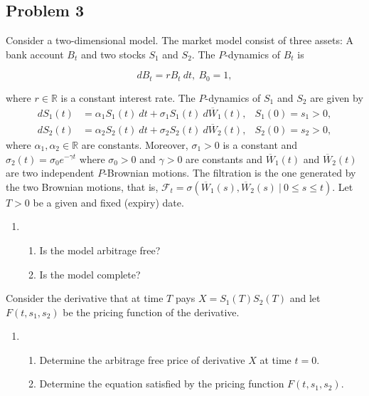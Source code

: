\documentclass[a4paper,12pt,openany]{book}
\providecommand{\tightlist}{%
 \setlength{\itemsep}{0pt}\setlength{\parskip}{0pt}}
\begin{document}
\noindent\makebox[\linewidth]{\rule{\textwidth}{0.4pt}}

\hypertarget{problem-3}{%
\subsection{Problem 3}\label{problem-3}}

Consider a two-dimensional model. The market model consist of three assets: A bank account \(B_t\) and two stocks \(S_1\) and \(S_2\). The \(P\)-dynamics of \(B_t\) is

\[
dB_t=rB_t\ dt,\ B_0=1,
\]

where \(r\in\mathbb{R}\) is a constant interest rate. The \(P\)-dynamics of \(S_1\) and \(S_2\) are given by
\begin{align*}
dS_1(t)&=\alpha_1S_1(t)\ dt+\sigma_1S_1(t)\ d\overline{W}_1(t),&S_1(0)=s_1>0,\\
dS_2(t)&=\alpha_2S_2(t)\ dt+\sigma_2S_2(t)\ d\overline{W}_2(t),&S_2(0)=s_2>0,
\end{align*}
where \(\alpha_1,\alpha_2\in\mathbb{R}\) are constants. Moreover, \(\sigma_1>0\) is a constant and \(\sigma_2(t)=\sigma_0e^{-\gamma t}\) where \(\sigma_0>0\) and \(\gamma>0\) are constants and \(\overline{W}_1(t)\) and \(\overline{W}_2(t)\) are two independent \(P\)-Brownian motions. The filtration is the one generated by the two Brownian motions, that is, \(\mathcal{F}_t=\sigma(\overline{W}_1(s),\overline{W}_2(s)\ \vert\ 0\le s\le t)\). Let \(T>0\) be a given and fixed (expiry) date.

\begin{enumerate}
\def\labelenumi{\alph{enumi}.}
\item
  \begin{enumerate}
  \def\labelenumii{\roman{enumii}.}
  \tightlist
  \item
    Is the model arbitrage free?
  \item
    Is the model complete?
  \end{enumerate}
\end{enumerate}

Consider the derivative that at time \(T\) pays \(X=S_1(T)S_2(T)\) and let \(F(t,s_1,s_2)\) be the pricing function of the derivative.

\begin{enumerate}
\def\labelenumi{\alph{enumi}.}
\setcounter{enumi}{1}
\item
  \begin{enumerate}
  \def\labelenumii{\roman{enumii}.}
  \tightlist
  \item
    Determine the arbitrage free price of derivative \(X\) at time \(t=0\).
  \item
    Determine the equation satisfied by the pricing function \(F(t,s_1,s_2)\).
  \end{enumerate}
\end{enumerate}
\end{document}

